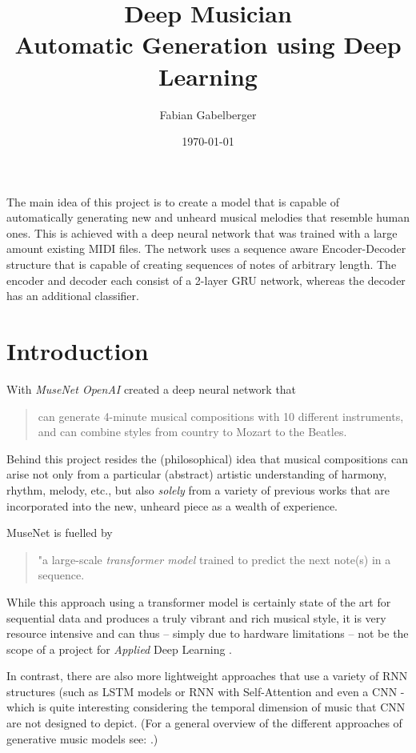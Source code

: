 \documentclass[a4paper, 10pt, xcolor=dvipsnames]{article} %
\date{\vspace{-9ex}} %
\title{Deep Musician
\vspace{0.25em}
\\ \large Automatic Generation using Deep Learning
}
\author{Fabian Gabelberger}
\date{\today}
\renewenvironment{abstract}
 {\small
  \begin{center}
  \bfseries \abstractname\vspace{-.5em}\vspace{0pt}
  \end{center}
  \list{}{
    \setlength{\leftmargin}{3cm}%
    \setlength{\rightmargin}{\leftmargin}%
  }%
  \item\relax}
 {\endlist}
\begin{document}
\maketitle
\vspace{2em}

\begin{abstract}
  The main idea of this project is to create a model that is capable of
  automatically generating new and unheard musical melodies that resemble human
  ones. This is achieved with a deep neural network that was trained with a
  large amount existing MIDI files. The network uses a sequence aware
  Encoder-Decoder structure that is capable of creating sequences of notes of
  arbitrary length. The encoder and decoder each consist of a 2-layer GRU
  network, whereas the decoder has an additional classifier.
\end{abstract}

\section{Introduction}
With \emph{MuseNet OpenAI} created a deep neural network that
\blockcquote{payne2019}{can generate 4-minute musical compositions with 10
  different instruments, and can combine styles from country to Mozart to the
  Beatles.} Behind this project resides the (philosophical) idea that musical
compositions can arise not only from a particular (abstract) artistic
understanding of harmony, rhythm, melody, etc., but also \emph{solely} from a
variety of previous works that are incorporated into the new, unheard piece as
a wealth of experience.

MuseNet is fuelled by \blockcquote{payne2019}{"a large-scale \emph{transformer
    model} trained to predict the next note(s) in a sequence.} While this
approach using a transformer model is certainly state of the art for
sequential data and produces a truly vibrant and rich musical style, it is
very resource intensive and can thus -- simply due to hardware limitations
-- not be the scope of a project for \emph{Applied} Deep Learning .

In contrast, there are also more lightweight approaches that use a variety of
RNN structures (such as LSTM models or RNN \cite{lewandowski2012,
  jedrzejewska2018, hewahi2019, ycart2017, mangal2019} with Self-Attention
\cite{jagannathan2022} and even a CNN \cite{yang2017} - which is quite
interesting considering the temporal dimension of music that CNN are not
designed to depict. (For a general overview of the different approaches of
generative music models see: \cite{briot2017}.)
\end{document}

